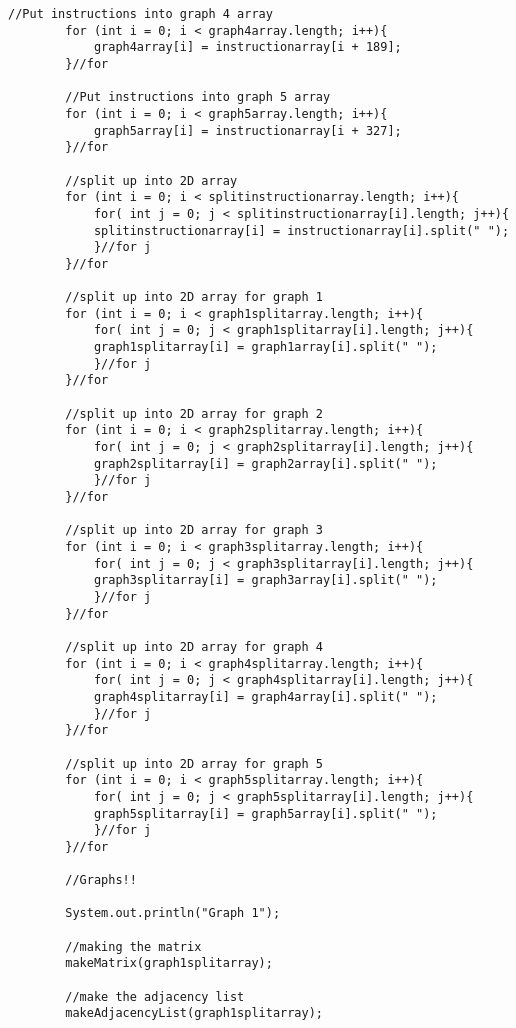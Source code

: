 \documentclass[letterpaper, 10pt,DIV=13]{scrartcl}
\numberwithin{equation}{section} %
\numberwithin{figure}{section} %
\numberwithin{table}{section} %
\begin{document}
\begin{lstlisting}[frame=single, ]
        //Put instructions into graph 4 array
        for (int i = 0; i < graph4array.length; i++){
            graph4array[i] = instructionarray[i + 189];
        }//for

        //Put instructions into graph 5 array 
        for (int i = 0; i < graph5array.length; i++){
            graph5array[i] = instructionarray[i + 327];
        }//for
        
        //split up into 2D array 
        for (int i = 0; i < splitinstructionarray.length; i++){
            for( int j = 0; j < splitinstructionarray[i].length; j++){
            splitinstructionarray[i] = instructionarray[i].split(" ");
            }//for j 
        }//for

        //split up into 2D array for graph 1
        for (int i = 0; i < graph1splitarray.length; i++){
            for( int j = 0; j < graph1splitarray[i].length; j++){
            graph1splitarray[i] = graph1array[i].split(" ");
            }//for j 
        }//for

        //split up into 2D array for graph 2
        for (int i = 0; i < graph2splitarray.length; i++){
            for( int j = 0; j < graph2splitarray[i].length; j++){
            graph2splitarray[i] = graph2array[i].split(" ");
            }//for j 
        }//for

        //split up into 2D array for graph 3
        for (int i = 0; i < graph3splitarray.length; i++){
            for( int j = 0; j < graph3splitarray[i].length; j++){
            graph3splitarray[i] = graph3array[i].split(" ");
            }//for j 
        }//for

        //split up into 2D array for graph 4
        for (int i = 0; i < graph4splitarray.length; i++){
            for( int j = 0; j < graph4splitarray[i].length; j++){
            graph4splitarray[i] = graph4array[i].split(" ");
            }//for j 
        }//for

        //split up into 2D array for graph 5
        for (int i = 0; i < graph5splitarray.length; i++){
            for( int j = 0; j < graph5splitarray[i].length; j++){
            graph5splitarray[i] = graph5array[i].split(" ");
            }//for j 
        }//for
 
        //Graphs!!

        System.out.println("Graph 1");

        //making the matrix
        makeMatrix(graph1splitarray);

        //make the adjacency list
        makeAdjacencyList(graph1splitarray);


\end{lstlisting}
\end{document}
